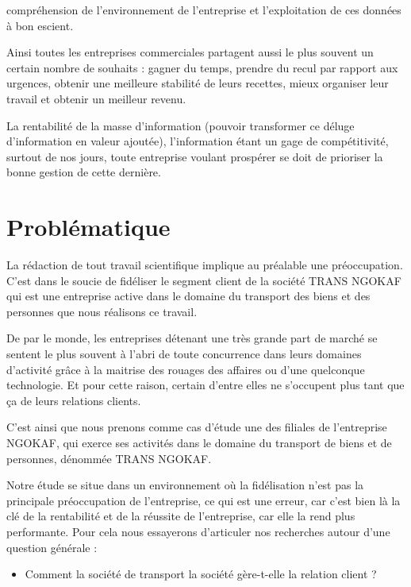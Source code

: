     compréhension de l’environnement de l’entreprise et l’exploitation de ces données à bon
    escient.
    \par
    Ainsi toutes les entreprises commerciales partagent aussi
    le plus souvent un certain nombre de souhaits : gagner
    du temps, prendre du recul par rapport aux urgences, obtenir une meilleure
    stabilité de leurs recettes, mieux organiser leur travail et obtenir un meilleur
    revenu. \cite*{Barouch2010}
    \par
    La rentabilité de la masse d’information (pouvoir transformer ce déluge
    d’information en valeur ajoutée), l’information étant un gage de compétitivité, surtout
    de nos jours, toute entreprise voulant prospérer se doit de prioriser la bonne gestion de
    cette dernière.
    \section[Problématique]{Problématique}
    La rédaction de tout travail scientifique implique au préalable une préoccupation.
    C’est dans le soucie de fidéliser le segment client de la société TRANS NGOKAF qui est une
    entreprise active dans le domaine du transport des biens et des personnes que nous
    réalisons ce travail.
    \par
    De par le monde, les entreprises détenant une très grande part de marché
    se sentent le plus souvent à l’abri de toute concurrence
    dans leurs domaines d’activité grâce à la maitrise des rouages des affaires
    ou d’une quelconque technologie. \cite*{Rouviere2010} Et pour cette raison,
    certain d’entre elles ne s’occupent plus tant que ça de leurs relations clients.
    \par
    C’est ainsi que nous prenons comme cas d’étude une des filiales de l’entreprise NGOKAF,
    qui exerce ses activités dans le domaine du transport de biens et de personnes, dénommée
    TRANS NGOKAF.
    \par
    Notre étude se situe dans un environnement où la fidélisation n’est pas la principale
    préoccupation de l’entreprise, ce qui est une erreur, car c’est bien là la clé
    de la rentabilité et de la réussite de l’entreprise, car elle la rend plus performante.
    Pour cela nous essayerons d’articuler nos recherches autour d’une question générale :
    \par
        \begin{itemize}
            \item [\ding{226}] Comment la société de transport la société
            gère-t-elle la relation client ?
        \end{itemize}
